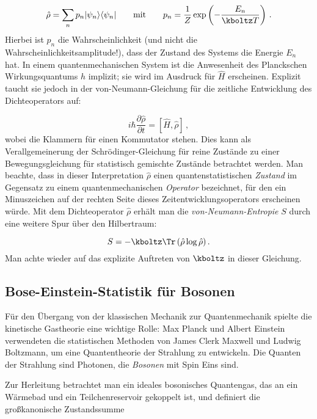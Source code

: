 \documentclass{scrartcl}
\begin{document}
\begin{equation*}
  \hat \rho=\sum_n p_n |\psi_n\rangle \langle \psi_n|
    \qquad \textrm{mit} \qquad
    p_n=\frac{1}{Z} \exp\left(-\frac{E_n}{\kboltz T}\right)\,.
\end{equation*}
%
Hierbei ist $p_n$ die Wahrscheinlichkeit (und nicht die Wahrscheinlichkeitsamplitude!), dass der Zustand des Systems die Energie $E_n$ hat. In einem quantenmechanischen System ist die Anwesenheit des Planckschen Wirkungsquantums $h$ implizit; sie wird im Ausdruck für $\hat H$ erscheinen. Explizit taucht sie jedoch in der {von-Neumann-Gleichung} für die zeitliche Entwicklung des Dichteoperators auf:

\begin{equation*}\label{eq:vNeumann}
  i \hbar \frac{\partial \hat \rho}{\partial t}=\left[\hat H, \hat \rho\right]\,,
\end{equation*}
%
wobei die Klammern für einen Kommutator stehen. Dies kann als Verallgemeinerung der Schrödinger-Gleichung für reine Zustände zu einer Bewegungsgleichung für statistisch gemischte Zustände betrachtet werden. Man beachte, dass in dieser Interpretation $\hat \rho$ einen quantenstatistischen \emph{Zustand} im Gegensatz zu einem quantenmechanischen \emph{Operator} bezeichnet, für den ein Minuszeichen auf der rechten Seite dieses Zeitentwicklungsoperators erscheinen würde. Mit dem Dichteoperator $\hat \rho$ erhält man die \emph{von-Neumann-Entropie} $S$ durch eine weitere Spur über den Hilbertraum:

\begin{equation*}
  S=-\kboltz \Tr \left( \hat \rho \log \hat \rho \right).
\end{equation*}
%
Man achte wieder auf das explizite Auftreten von $\kboltz$ in dieser Gleichung.


\subsection*{Bose-Einstein-Statistik für Bosonen}

Für den Übergang von der klassischen Mechanik zur Quantenmechanik spielte die kinetische Gastheorie eine wichtige Rolle: Max Planck und Albert Einstein verwendeten die statistischen Methoden von James Clerk Maxwell und Ludwig Boltzmann, um eine Quantentheorie der Strahlung zu entwickeln. Die Quanten der Strahlung sind Photonen, die \emph{Bosonen} mit Spin Eins sind.

Zur Herleitung betrachtet man ein ideales bosonisches Quantengas, das an ein Wärmebad und ein Teilchenreservoir gekoppelt ist, und definiert die großkanonische Zustandssumme
\end{document}
